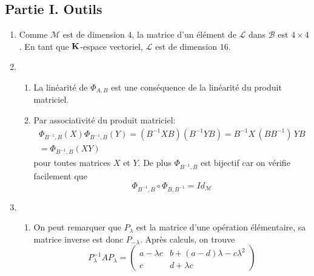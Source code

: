 
\subsection*{Partie I. Outils}
\begin{enumerate}
 \item Comme $\mathcal{M}$ est de dimension $4$, la matrice d'un élément de $\mathcal{L}$ dans $\mathcal{B}$ est $4\times4$. En tant que $\mathbf{K}$-espace vectoriel, $\mathcal{L}$ est de dimension $16$. 
 \item
\begin{enumerate}
 \item La lin\'{e}arit\'{e} de $\Phi_{A,B} $ est une cons\'{e}quence de la lin\'{e}arit\'{e} du produit matriciel.
 \item Par associativité du produit matriciel:
\begin{multline*}
 \Phi_{B^{-1},B}(X)\Phi_{B^{-1},B}(Y)
= \left( B^{-1}XB\right) \left( B^{-1}YB\right)
=  B^{-1}X\,(B B^{-1})\,YB \\
= \Phi_{B^{-1},B}(XY)
\end{multline*}
pour toutes matrices $X$ et $Y$. De plus $\Phi_{B^{-1},B}$ est bijectif car on vérifie facilement que
\begin{displaymath}
 \Phi_{B^{-1},B} \circ \Phi_{B,B^{-1}} = Id_{\mathcal{M}}
\end{displaymath}
\end{enumerate}

 \item
\begin{enumerate}
 \item On peut remarquer que $P_\lambda$ est la matrice d'une opération élémentaire, sa matrice inverse est donc $P_{-\lambda}$. Après calculs, on trouve
\begin{displaymath}
 P_{\lambda}^{-1}AP_\lambda =
\begin{pmatrix}
 a-\lambda c & b+(a-d)\lambda-c\lambda^2\\
c & d+\lambda c
\end{pmatrix}
\end{displaymath}


\end{enumerate}
\end{enumerate}
